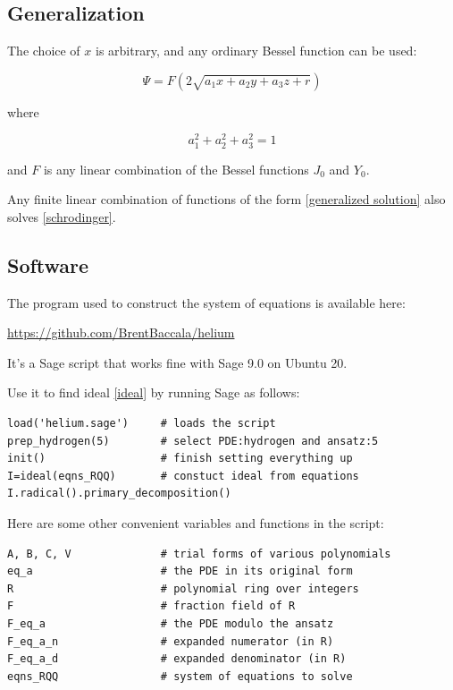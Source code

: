 \documentclass{article}
\begin{document}
\subsection*{Generalization}
\parskip 12pt

The choice of $x$ is arbitrary, and any ordinary Bessel function can be used:

\begin{equation}
\label{generalized solution}
\Psi = F(2\sqrt{a_1 x+ a_2 y+ a_3 z+r})
\end{equation}

where

\begin{equation*}
a_1^2+a_2^2+a_3^2=1
\end{equation*}

and $F$ is any linear combination of the Bessel functions $J_0$ and $Y_0$.

\vskip 12pt

Any finite linear combination of functions of the form \eqref{generalized solution} also solves \eqref{schrodinger}.

\subsection*{Software}

The program used to construct the system of equations is available here:

\centerline{\url{https://github.com/BrentBaccala/helium}}

It's a Sage script that works fine with Sage 9.0 on Ubuntu 20.

Use it to find ideal \eqref{ideal} by
running Sage as follows:

\begin{verbatim}
load('helium.sage')     # loads the script
prep_hydrogen(5)        # select PDE:hydrogen and ansatz:5
init()                  # finish setting everything up
I=ideal(eqns_RQQ)       # constuct ideal from equations
I.radical().primary_decomposition()
\end{verbatim}

Here are some other convenient variables and functions in the script:

\begin{verbatim}
A, B, C, V              # trial forms of various polynomials
eq_a                    # the PDE in its original form
R                       # polynomial ring over integers
F                       # fraction field of R
F_eq_a                  # the PDE modulo the ansatz
F_eq_a_n                # expanded numerator (in R)
F_eq_a_d                # expanded denominator (in R)
eqns_RQQ                # system of equations to solve
\end{verbatim}
\end{document}
